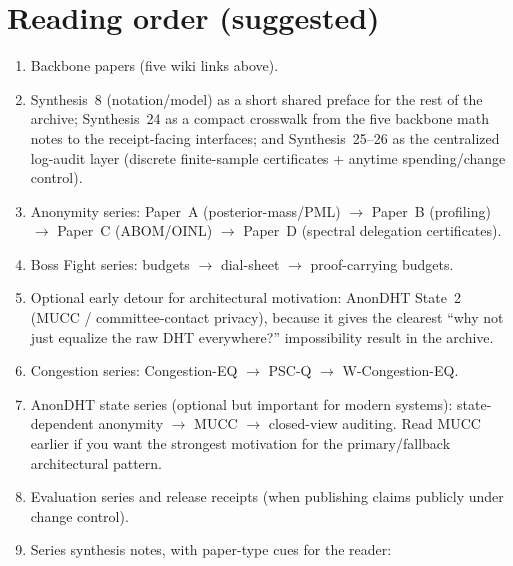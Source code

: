 \documentclass[11pt]{article}
\begin{document}
\section{Reading order (suggested)}
\begin{enumerate}[leftmargin=*]
\item Backbone papers (five wiki links above).
\item Synthesis~8 (notation/model) as a short shared preface for the rest of the archive; Synthesis~24 as a compact crosswalk from the five backbone math notes to the receipt-facing interfaces; and Synthesis~25--26 as the centralized log-audit layer (discrete finite-sample certificates + anytime spending/change control).
\item Anonymity series: Paper~A (posterior-mass/PML) $\rightarrow$ Paper~B (profiling) $\rightarrow$ Paper~C (ABOM/OINL) $\rightarrow$ Paper~D (spectral delegation certificates).
\item Boss Fight series: budgets $\rightarrow$ dial-sheet $\rightarrow$ proof-carrying budgets.
\item Optional early detour for architectural motivation: AnonDHT State~2 (MUCC / committee-contact privacy), because it gives the clearest ``why not just equalize the raw DHT everywhere?'' impossibility result in the archive.
\item Congestion series: Congestion-EQ $\rightarrow$ PSC-Q $\rightarrow$ W-Congestion-EQ.
\item AnonDHT state series (optional but important for modern systems): state-dependent anonymity $\rightarrow$ MUCC $\rightarrow$ closed-view auditing. Read MUCC earlier if you want the strongest motivation for the primary/fallback architectural pattern.
\item Evaluation series and release receipts (when publishing claims publicly under change control).
\item Series synthesis notes, with paper-type cues for the reader:

\end{enumerate}
\end{document}
